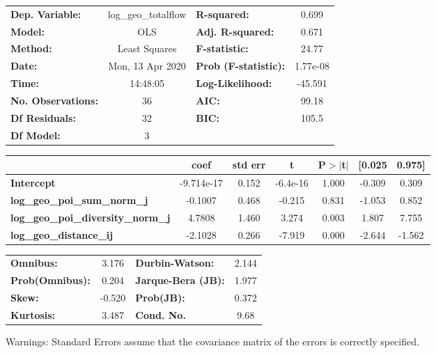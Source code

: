 \begin{center}
\begin{tabular}{lclc}
\toprule
\textbf{Dep. Variable:}                    & log\_geo\_totalflow & \textbf{  R-squared:         } &     0.699   \\
\textbf{Model:}                            &         OLS         & \textbf{  Adj. R-squared:    } &     0.671   \\
\textbf{Method:}                           &    Least Squares    & \textbf{  F-statistic:       } &     24.77   \\
\textbf{Date:}                             &   Mon, 13 Apr 2020  & \textbf{  Prob (F-statistic):} &  1.77e-08   \\
\textbf{Time:}                             &       14:48:05      & \textbf{  Log-Likelihood:    } &   -45.591   \\
\textbf{No. Observations:}                 &            36       & \textbf{  AIC:               } &     99.18   \\
\textbf{Df Residuals:}                     &            32       & \textbf{  BIC:               } &     105.5   \\
\textbf{Df Model:}                         &             3       & \textbf{                     } &             \\
\bottomrule
\end{tabular}
\begin{tabular}{lcccccc}
                                           & \textbf{coef} & \textbf{std err} & \textbf{t} & \textbf{P$> |$t$|$} & \textbf{[0.025} & \textbf{0.975]}  \\
\midrule
\textbf{Intercept}                         &   -9.714e-17  &        0.152     &  -6.4e-16  &         1.000        &       -0.309    &        0.309     \\
\textbf{log\_geo\_poi\_sum\_norm\_j}       &      -0.1007  &        0.468     &    -0.215  &         0.831        &       -1.053    &        0.852     \\
\textbf{log\_geo\_poi\_diversity\_norm\_j} &       4.7808  &        1.460     &     3.274  &         0.003        &        1.807    &        7.755     \\
\textbf{log\_geo\_distance\_ij}            &      -2.1028  &        0.266     &    -7.919  &         0.000        &       -2.644    &       -1.562     \\
\bottomrule
\end{tabular}
\begin{tabular}{lclc}
\textbf{Omnibus:}       &  3.176 & \textbf{  Durbin-Watson:     } &    2.144  \\
\textbf{Prob(Omnibus):} &  0.204 & \textbf{  Jarque-Bera (JB):  } &    1.977  \\
\textbf{Skew:}          & -0.520 & \textbf{  Prob(JB):          } &    0.372  \\
\textbf{Kurtosis:}      &  3.487 & \textbf{  Cond. No.          } &     9.68  \\
\bottomrule
\end{tabular}
\end{center}

Warnings: \newline
 [1] Standard Errors assume that the covariance matrix of the errors is correctly specified.